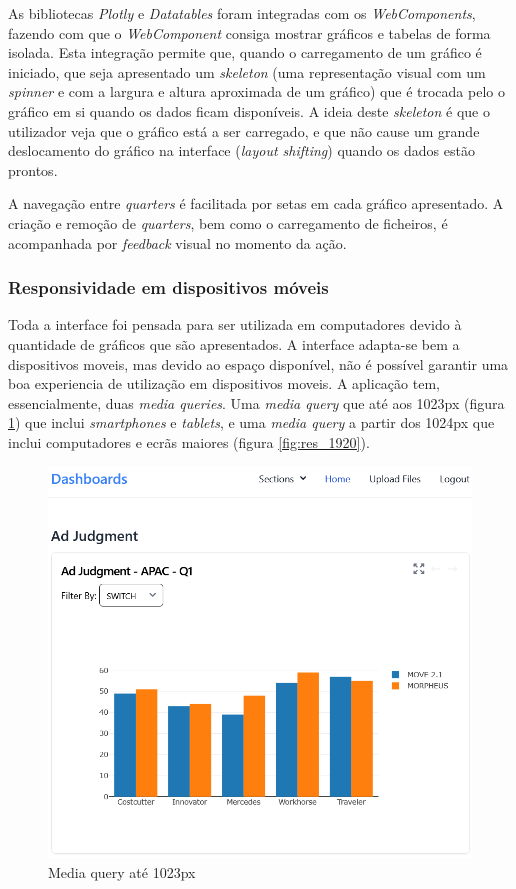 As bibliotecas \textit{Plotly} e \textit{Datatables} foram integradas com os \textit{WebComponents}\cite{webcomponents}, fazendo com que o \textit{WebComponent} consiga mostrar gráficos e tabelas de forma isolada. Esta integração permite que, quando o carregamento de um gráfico é iniciado, que seja apresentado  um \textit{skeleton} (uma representação visual com um \textit{spinner} e com a largura e altura aproximada de um gráfico) que é trocada pelo o gráfico em si quando os dados ficam disponíveis. A ideia deste \textit{skeleton} é que o utilizador veja que o gráfico está a ser carregado, e que não cause um grande deslocamento do gráfico na interface (\textit{layout shifting}) quando os dados estão prontos. 

A navegação entre \textit{quarters} é facilitada por setas em cada gráfico apresentado. A criação e remoção de \textit{quarters}, bem como o carregamento de ficheiros, é acompanhada por \textit{feedback} visual no momento da ação.

\subsubsection{Responsividade em dispositivos móveis}

Toda a interface foi pensada para ser utilizada em computadores devido à quantidade de gráficos que são apresentados. A interface adapta-se bem a dispositivos moveis, mas devido ao espaço disponível, não é possível garantir uma boa experiencia de utilização em dispositivos moveis. A aplicação tem, essencialmente, duas \textit{media queries}. Uma \textit{media query} que até aos 1023px (figura \ref{fig:res_1023}) que inclui \textit{smartphones} e \textit{tablets}, e uma \textit{media query} a partir dos 1024px que inclui computadores e ecrãs maiores (figura \ref{fig:res_1920}).

\begin{figure}[htbp]
    \centering
    \includegraphics[max width=\textwidth]{./img/res_1023}
 \caption{Media query até 1023px}
 \label{fig:res_1023}
\end{figure}

